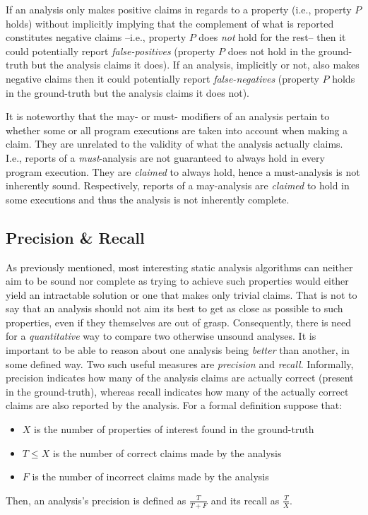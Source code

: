 If an analysis only makes positive claims in regards to a property (i.e., property $P$ holds) without implicitly implying that the complement of what is reported constitutes negative claims --i.e., property $P$ does \emph{not} hold for the rest-- then it could potentially report \emph{false-positives} (property $P$ does not hold in the ground-truth but the analysis claims it does). If an analysis, implicitly or not, also makes negative claims then it could potentially report \emph{false-negatives} (property $P$ holds in the ground-truth but the analysis claims it does not).

It is noteworthy that the may- or must- modifiers of an analysis pertain to whether some or all program executions are taken into account when making a claim. They are unrelated to the validity of what the analysis actually claims. I.e., reports of a \emph{must}-analysis are not guaranteed to always hold in every program execution. They are \emph{claimed} to always hold, hence a must-analysis is not inherently sound. Respectively, reports of a may-analysis are \emph{claimed} to hold in some executions and thus the analysis is not inherently complete.

\subsection{Precision \& Recall}

As previously mentioned, most interesting static analysis algorithms can neither aim to be sound nor complete as trying to achieve such properties would either yield an intractable solution or one that makes only trivial claims. That is not to say that an analysis should not aim its best to get as close as possible to such properties, even if they themselves are out of grasp. Consequently, there is need for a \emph{quantitative} way to compare two otherwise unsound analyses. It is important to be able to reason about one analysis being \emph{better} than another, in some defined way. Two such useful measures are \emph{precision} and \emph{recall}. Informally, precision indicates how many of the analysis claims are actually correct (present in the ground-truth), whereas recall indicates how many of the actually correct claims are also reported by the analysis. For a formal definition suppose that:
\begin{itemize}
    \item $X$ is the number of properties of interest found in the ground-truth
    \item $T \leq X$ is the number of correct claims made by the analysis
    \item $F$ is the number of incorrect claims made by the analysis
\end{itemize}
Then, an analysis's precision is defined as \( \frac{T}{T + F} \) and its recall as \( \frac{T}{X} \).

